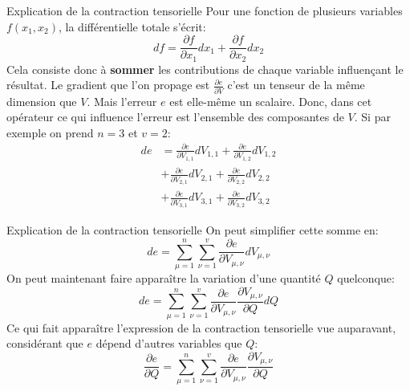 \begin{frame}{Explication de la contraction tensorielle}
	Pour une fonction de plusieurs variables $f(x_1, x_2)$, la différentielle totale s'écrit:
	\begin{equation*}
		df = \frac{\partial{f}}{\partial{x_1}} dx_1 + \frac{\partial{f}}{\partial{x_2}} dx_2
	\end{equation*}
	\pause
	Cela consiste donc à \textbf{sommer} les contributions de chaque variable influençant le résultat. Le gradient que l'on propage est $\frac{\partial{e}}{\partial{V}}$ c'est un tenseur de la même dimension que $V$. Mais l'erreur $e$ est elle-même un scalaire. Donc, dans cet opérateur ce qui influence l'erreur est l'ensemble des composantes de $V$. Si par exemple on prend $n = 3$ et $v = 2$:
	\begin{equation*}
		\begin{aligned}
			de &= \frac{\partial{e}}{\partial{V_{1,1}}} dV_{1,1} + \frac{\partial{e}}{\partial{V_{1,2}}} dV_{1,2} \\
		       &+ \frac{\partial{e}}{\partial{V_{2,1}}} dV_{2,1} + \frac{\partial{e}}{\partial{V_{2,2}}} dV_{2,2} \\
		       &+ \frac{\partial{e}}{\partial{V_{3,1}}} dV_{3,1} + \frac{\partial{e}}{\partial{V_{3,2}}} dV_{3,2}
		\end{aligned}
	\end{equation*}
\end{frame}

\begin{frame}{Explication de la contraction tensorielle}
	On peut simplifier cette somme en:
	\begin{equation*}
		de = \sum_{\mu=1}^n \sum_{\nu=1}^v \frac{\partial{e}}{\partial{V_{\mu,\nu}}} dV_{\mu,\nu}
	\end{equation*}
	\pause
	On peut maintenant faire apparaître la variation d'une quantité $Q$ quelconque:
	\begin{equation*}
		de = \sum_{\mu=1}^n \sum_{\nu=1}^v \frac{\partial{e}}{\partial{V_{\mu,\nu}}} \frac{\partial{V}_{\mu,\nu}}{\partial{Q}} dQ 
	\end{equation*}
	\pause
	Ce qui fait apparaître l'expression de la contraction tensorielle vue auparavant, considérant que $e$ dépend d'autres variables que $Q$:
	\begin{equation*}
		\frac{\partial{e}}{\partial{Q}} = \sum_{\mu=1}^n \sum_{\nu=1}^v \frac{\partial{e}}{\partial{V_{\mu,\nu}}} \frac{\partial{V}_{\mu,\nu}}{\partial{Q}}
	\end{equation*}
\end{frame}


